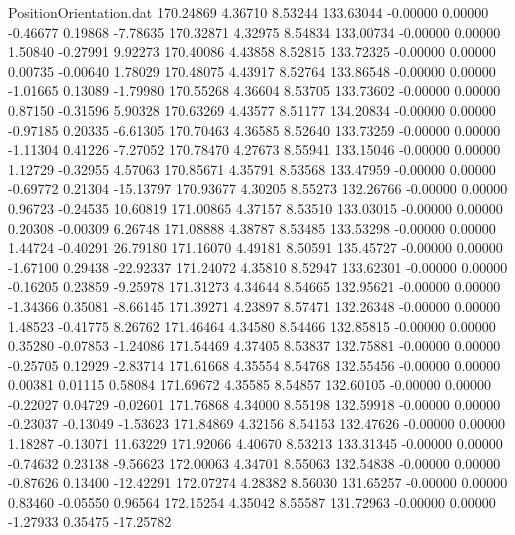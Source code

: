 \begin{filecontents}{PositionOrientation.dat}
 170.24869    4.36710    8.53244   133.63044   -0.00000    0.00000   -0.46677    0.19868   -7.78635
 170.32871    4.32975    8.54834   133.00734   -0.00000    0.00000    1.50840   -0.27991    9.92273
 170.40086    4.43858    8.52815   133.72325   -0.00000    0.00000    0.00735   -0.00640    1.78029
 170.48075    4.43917    8.52764   133.86548   -0.00000    0.00000   -1.01665    0.13089   -1.79980
 170.55268    4.36604    8.53705   133.73602   -0.00000    0.00000    0.87150   -0.31596    5.90328
 170.63269    4.43577    8.51177   134.20834   -0.00000    0.00000   -0.97185    0.20335   -6.61305
 170.70463    4.36585    8.52640   133.73259   -0.00000    0.00000   -1.11304    0.41226   -7.27052
 170.78470    4.27673    8.55941   133.15046   -0.00000    0.00000    1.12729   -0.32955    4.57063
 170.85671    4.35791    8.53568   133.47959   -0.00000    0.00000   -0.69772    0.21304  -15.13797
 170.93677    4.30205    8.55273   132.26766   -0.00000    0.00000    0.96723   -0.24535   10.60819
 171.00865    4.37157    8.53510   133.03015   -0.00000    0.00000    0.20308   -0.00309    6.26748
 171.08888    4.38787    8.53485   133.53298   -0.00000    0.00000    1.44724   -0.40291   26.79180
 171.16070    4.49181    8.50591   135.45727   -0.00000    0.00000   -1.67100    0.29438  -22.92337
 171.24072    4.35810    8.52947   133.62301   -0.00000    0.00000   -0.16205    0.23859   -9.25978
 171.31273    4.34644    8.54665   132.95621   -0.00000    0.00000   -1.34366    0.35081   -8.66145
 171.39271    4.23897    8.57471   132.26348   -0.00000    0.00000    1.48523   -0.41775    8.26762
 171.46464    4.34580    8.54466   132.85815   -0.00000    0.00000    0.35280   -0.07853   -1.24086
 171.54469    4.37405    8.53837   132.75881   -0.00000    0.00000   -0.25705    0.12929   -2.83714
 171.61668    4.35554    8.54768   132.55456   -0.00000    0.00000    0.00381    0.01115    0.58084
 171.69672    4.35585    8.54857   132.60105   -0.00000    0.00000   -0.22027    0.04729   -0.02601
 171.76868    4.34000    8.55198   132.59918   -0.00000    0.00000   -0.23037   -0.13049   -1.53623
 171.84869    4.32156    8.54153   132.47626   -0.00000    0.00000    1.18287   -0.13071   11.63229
 171.92066    4.40670    8.53213   133.31345   -0.00000    0.00000   -0.74632    0.23138   -9.56623
 172.00063    4.34701    8.55063   132.54838   -0.00000    0.00000   -0.87626    0.13400  -12.42291
 172.07274    4.28382    8.56030   131.65257   -0.00000    0.00000    0.83460   -0.05550    0.96564
 172.15254    4.35042    8.55587   131.72963   -0.00000    0.00000   -1.27933    0.35475  -17.25782

\end{filecontents}
